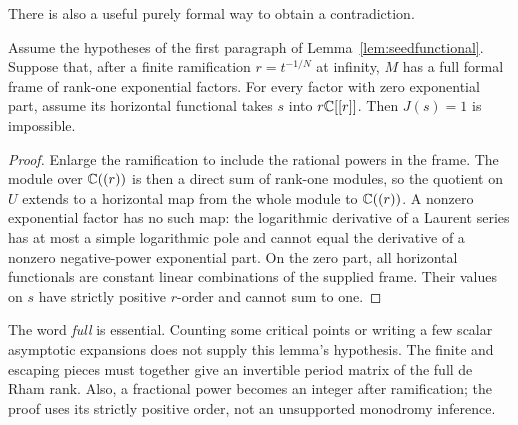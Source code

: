 There is also a useful purely formal way to obtain a contradiction.

\begin{lemma}\label{lem:positiveformal}
Assume the hypotheses of the first paragraph of
Lemma~\ref{lem:seedfunctional}. Suppose that, after a finite ramification
$r=t^{-1/N}$ at infinity, $M$ has a full formal frame of rank-one
exponential factors. For every factor with zero exponential part,
assume its horizontal functional takes $s$ into $r\mathbb C[[r]]$.
Then $J(s)=1$ is impossible.
\end{lemma}
\begin{proof}
Enlarge the ramification to include the rational powers in the frame.
The module over $\mathbb C((r))$ is then a direct sum of rank-one modules,
so the quotient on $U$ extends to a horizontal map from the whole
module to $\mathbb C((r))$. A nonzero exponential factor has no such map:
the logarithmic derivative of a Laurent series has at most a simple
logarithmic pole and cannot equal the derivative of a nonzero
negative-power exponential part. On the zero part, all horizontal
functionals are constant linear combinations of the supplied frame.
Their values on $s$ have strictly positive $r$-order and cannot sum
to one.
\end{proof}

The word \emph{full} is essential. Counting some critical points or
writing a few scalar asymptotic expansions does not supply this lemma's
hypothesis. The finite and escaping pieces must together give an
invertible period matrix of the full de Rham rank. Also, a fractional
power becomes an integer after ramification; the proof uses its
strictly positive order, not an unsupported monodromy inference.
